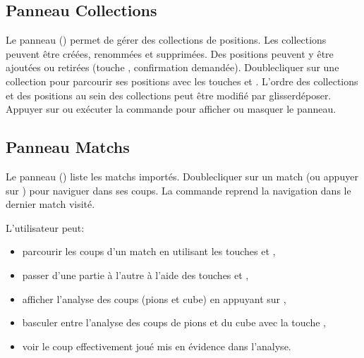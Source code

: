 \documentclass[letterpaper,10pt,french]{sphinxmanual}
\begin{document}
\subsection{Panneau Collections}
\label{\detokenize{manuel:panneau-collections}}\label{\detokenize{manuel:id6}}
\sphinxAtStartPar
Le panneau  () permet de gérer des collections de
positions. Les collections peuvent être créées, renommées et supprimées. Des
positions peuvent y être ajoutées ou retirées (touche , confirmation
demandée). Double\sphinxhyphen{}cliquer sur une collection pour parcourir ses positions
avec les touches  et . L’ordre des collections et des
positions au sein des collections peut être modifié par glisser\sphinxhyphen{}déposer.
Appuyer sur  ou exécuter la commande  pour afficher ou
masquer le panneau.


\subsection{Panneau Matchs}
\label{\detokenize{manuel:panneau-matchs}}\label{\detokenize{manuel:id7}}
\sphinxAtStartPar
Le panneau  () liste les matchs importés. Double\sphinxhyphen{}cliquer
sur un match (ou appuyer sur ) pour naviguer dans ses coups. La
commande  reprend la navigation dans le dernier match visité.

\sphinxAtStartPar
L’utilisateur peut:
\begin{itemize}
\item {} 
\sphinxAtStartPar
parcourir les coups d’un match en utilisant les touches  et ,

\item {} 
\sphinxAtStartPar
passer d’une partie à l’autre à l’aide des touches  et ,

\item {} 
\sphinxAtStartPar
afficher l’analyse des coups (pions et cube) en appuyant sur ,

\item {} 
\sphinxAtStartPar
basculer entre l’analyse des coups de pions et du cube avec la touche ,

\item {} 
\sphinxAtStartPar
voir le coup effectivement joué mis en évidence dans l’analyse.

\end{itemize}
\end{document}

